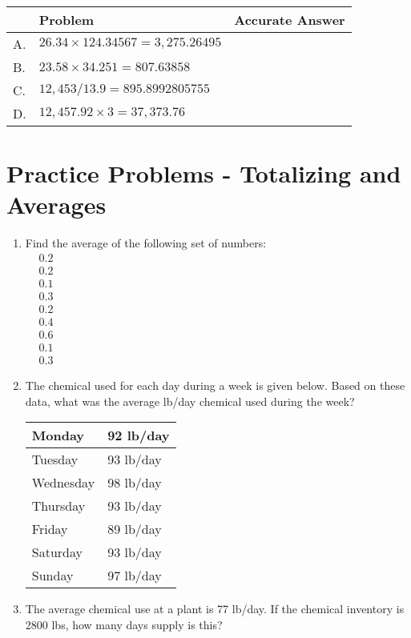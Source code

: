 \begin{tabular}{|l|l|l|}
\hline
 & Problem & Accurate Answer \\
\hline
A. & $26.34 \times 124.34567=3,275.26495$ &  \\
\hline
B. & $23.58 \times 34.251=807.63858$ &  \\
\hline
C. & $12,453 / 13.9=895.8992805755$ &  \\
\hline
D. & $12,457.92 \times 3=37,373.76$ &  \\
\hline
\end{tabular}

\section*{Practice Problems - Totalizing and Averages}
\begin{enumerate}

\item Find the average of the following set of numbers:\\
$
\begin{aligned}
&0.2 \\
&0.2 \\
&0.1 \\
&0.3 \\
&0.2 \\
&0.4 \\
&0.6 \\
&0.1 \\
&0.3
\end{aligned}
$

\item The chemical used for each day during a week is given below. Based on these data, what was the average lb/day chemical used during the week?\\

\begin{tabular}{|l|l|}
\hline
Monday & 92 lb/day\\
\hline
Tuesday & 93 lb/day \\
\hline
Wednesday & 98 lb/day\\
\hline
Thursday & 93 lb/day \\
\hline
Friday & 89 lb/day\\
\hline
Saturday & 93 lb/day \\
\hline
Sunday & 97 lb/day\\
\hline
\end{tabular}

\item The average chemical use at a plant is 77 lb/day. If the chemical inventory is 2800 lbs, how many days supply is this?


\end{enumerate}
